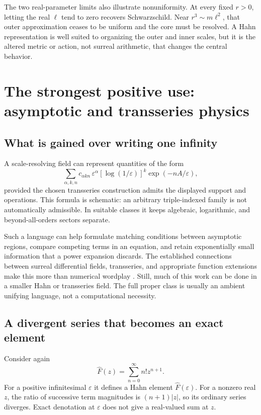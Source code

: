 \documentclass[11pt,a4paper]{article}
\numberwithin{equation}{section}
\theoremstyle{definition}
\theoremstyle{remark}
\newcommand{\eps}{\varepsilon}
\begin{document}
The two real-parameter limits also illustrate nonuniformity. At every fixed $r>0$, letting the real $\ell$ tend to zero recovers Schwarzschild. Near $r^3\sim m\ell^2$, that outer approximation ceases to be uniform and the core must be resolved. A Hahn representation is well suited to organizing the outer and inner scales, but it is the altered metric or action, not surreal arithmetic, that changes the central behavior.

\section{The strongest positive use: asymptotic and transseries physics}
\label{sec:transseries}

\subsection{What is gained over writing one infinity}
A scale-resolving field can represent quantities of the form
\begin{equation}\label{eq:schematictrans}
 \sum_{\alpha,k,n}c_{\alpha k n}\,
 \eps^\alpha[\log(1/\eps)]^k\exp(-nA/\eps),
\end{equation}
provided the chosen transseries construction admits the displayed support and operations. This formula is schematic: an arbitrary triple-indexed family is not automatically admissible. In suitable classes it keeps algebraic, logarithmic, and beyond-all-orders sectors separate.

Such a language can help formulate matching conditions between asymptotic regions, compare competing terms in an equation, and retain exponentially small information that a power expansion discards. The established connections between surreal differential fields, transseries, and appropriate function extensions make this more than numerical wordplay \cite{BM,ADH,CE}. Still, much of this work can be done in a smaller Hahn or transseries field. The full proper class is usually an ambient unifying language, not a computational necessity.

\subsection{A divergent series that becomes an exact element}
Consider again
\begin{equation}
 \widehat F(z)=\sum_{n=0}^{\infty}n!z^{n+1}.
\end{equation}
For a positive infinitesimal $\eps$ it defines a Hahn element $\widehat F(\eps)$. For a nonzero real $z$, the ratio of successive term magnitudes is $(n+1)|z|$, so its ordinary series diverges. Exact denotation at $\eps$ does not give a real-valued sum at $z$.
\end{document}
